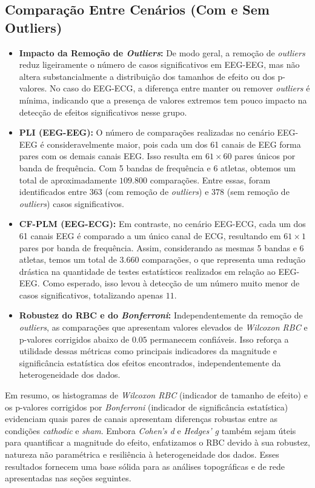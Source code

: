 \subsection{Comparação Entre Cenários (Com e Sem Outliers)}
\begin{itemize}
    \item \textbf{Impacto da Remoção de \textit{Outliers}:} De modo geral, a remoção de \textit{outliers} reduz ligeiramente o número de casos significativos em EEG-EEG, mas não altera substancialmente a distribuição dos tamanhos de efeito ou dos p-valores. No caso do EEG-ECG, a diferença entre manter ou remover \textit{outliers} é mínima, indicando que a presença de valores extremos tem pouco impacto na detecção de efeitos significativos nesse grupo.

    \item \textbf{PLI (EEG-EEG):} O número de comparações realizadas no cenário EEG-EEG é consideravelmente maior, pois cada um dos 61 canais de EEG forma pares com os demais canais EEG. Isso resulta em \( 61 \times 60 \) pares únicos por banda de frequência. Com 5 bandas de frequência e 6 atletas, obtemos um total de aproximadamente \( 109.800 \) comparações. Entre essas, foram identificados entre \( 363 \) (com remoção de \textit{outliers}) e \( 378 \) (sem remoção de \textit{outliers}) casos significativos.

    \item \textbf{CF-PLM (EEG-ECG):} Em contraste, no cenário EEG-ECG, cada um dos 61 canais EEG é comparado a um único canal de ECG, resultando em \( 61 \times 1 \) pares por banda de frequência. Assim, considerando as mesmas 5 bandas e 6 atletas, temos um total de \( 3.660 \) comparações, o que representa uma redução drástica na quantidade de testes estatísticos realizados em relação ao EEG-EEG. Como esperado, isso levou à detecção de um número muito menor de casos significativos, totalizando apenas \( 11 \).

    \item \textbf{Robustez do RBC e do \textit{Bonferroni}:} Independentemente da remoção de \textit{outliers}, as comparações que apresentam valores elevados de \textit{Wilcoxon RBC} e p-valores corrigidos abaixo de \( 0.05 \) permanecem confiáveis. Isso reforça a utilidade dessas métricas como principais indicadores da magnitude e significância estatística dos efeitos encontrados, independentemente da heterogeneidade dos dados.
\end{itemize}

Em resumo, os histogramas de \textit{Wilcoxon RBC} (indicador de tamanho de efeito) e os p-valores corrigidos por \textit{Bonferroni} (indicador de significância estatística) evidenciam quais pares de canais apresentam diferenças robustas entre as condições \textit{cathodic} e \textit{sham}. Embora \textit{Cohen's d} e \textit{Hedges' g} também sejam úteis para quantificar a magnitude do efeito, enfatizamos o RBC devido à sua robustez, natureza não paramétrica e resiliência à heterogeneidade dos dados. Esses resultados fornecem uma base sólida para as análises topográficas e de rede apresentadas nas seções seguintes.

